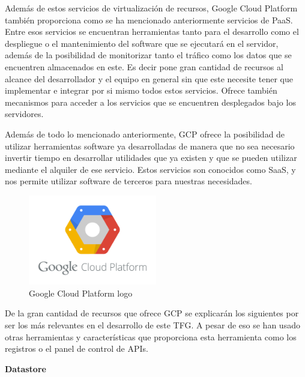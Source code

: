 Además de estos servicios de virtualización de recursos, Google Cloud Platform también proporciona como se ha mencionado anteriormente servicios de \acs{PaaS}. Entre esos servicios se encuentran herramientas tanto para el desarrollo como el despliegue o el mantenimiento del software que se ejecutará en el servidor, además de la posibilidad de monitorizar tanto el tráfico como los datos que se encuentren almacenados en este. Es decir pone gran cantidad de recursos al alcance del desarrollador y el equipo en general sin que este necesite tener que implementar e integrar por si mismo todos estos servicios. Ofrece también mecanismos para acceder a los servicios que se encuentren desplegados bajo los servidores.

Además de todo lo mencionado anteriormente, \acs{GCP} ofrece la posibilidad de utilizar herramientas software ya desarrolladas de manera que no sea necesario invertir tiempo en desarrollar utilidades que ya existen y que se pueden utilizar mediante el alquiler de ese servicio. Estos servicios son conocidos como \acs{SaaS}, y nos permite utilizar software de terceros para nuestras necesidades.


\begin{figure}[!h]
\begin{center}
\includegraphics[width=0.5\textwidth]{./figures/GCP.png}
\caption{Google Cloud Platform logo}
\label{fig:android-studio}
\end{center}
\end{figure}

De la gran cantidad de recursos que ofrece \acs{GCP} se explicarán los siguientes por ser los más relevantes en el desarrollo de este \acs{TFG}. A pesar de eso se han usado otras herramientas y características que proporciona esta herramienta como los registros o el panel de control de \acs{API}s.

\textbf{Datastore}

